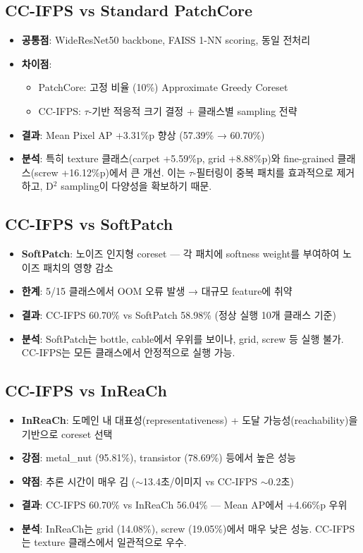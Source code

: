 \documentclass[11pt,a4paper]{article}
\begin{document}
\subsection{CC-IFPS vs Standard PatchCore}

\begin{itemize}
  \item \textbf{공통점}: WideResNet50 backbone, FAISS 1-NN scoring, 동일 전처리
  \item \textbf{차이점}:
  \begin{itemize}
    \item PatchCore: 고정 비율 (10\%) Approximate Greedy Coreset
    \item CC-IFPS: $\tau$-기반 적응적 크기 결정 + 클래스별 sampling 전략
  \end{itemize}
  \item \textbf{결과}: Mean Pixel AP +3.31\%p 향상 (57.39\% → 60.70\%)
  \item \textbf{분석}: 특히 texture 클래스(carpet +5.59\%p, grid +8.88\%p)와 fine-grained 클래스(screw +16.12\%p)에서 큰 개선. 이는 $\tau$-필터링이 중복 패치를 효과적으로 제거하고, D$^2$ sampling이 다양성을 확보하기 때문.
\end{itemize}

\subsection{CC-IFPS vs SoftPatch}

\begin{itemize}
  \item \textbf{SoftPatch}: 노이즈 인지형 coreset — 각 패치에 softness weight를 부여하여 노이즈 패치의 영향 감소
  \item \textbf{한계}: 5/15 클래스에서 OOM 오류 발생 → 대규모 feature에 취약
  \item \textbf{결과}: CC-IFPS 60.70\% vs SoftPatch 58.98\% (정상 실행 10개 클래스 기준)
  \item \textbf{분석}: SoftPatch는 bottle, cable에서 우위를 보이나, grid, screw 등 실행 불가. CC-IFPS는 모든 클래스에서 안정적으로 실행 가능.
\end{itemize}

\subsection{CC-IFPS vs InReaCh}

\begin{itemize}
  \item \textbf{InReaCh}: 도메인 내 대표성(representativeness) + 도달 가능성(reachability)을 기반으로 coreset 선택
  \item \textbf{강점}: metal\_nut (95.81\%), transistor (78.69\%) 등에서 높은 성능
  \item \textbf{약점}: 추론 시간이 매우 김 ($\sim$13.4초/이미지 vs CC-IFPS $\sim$0.2초)
  \item \textbf{결과}: CC-IFPS 60.70\% vs InReaCh 56.04\% — Mean AP에서 +4.66\%p 우위
  \item \textbf{분석}: InReaCh는 grid (14.08\%), screw (19.05\%)에서 매우 낮은 성능. CC-IFPS는 texture 클래스에서 일관적으로 우수.
\end{itemize}
\end{document}
